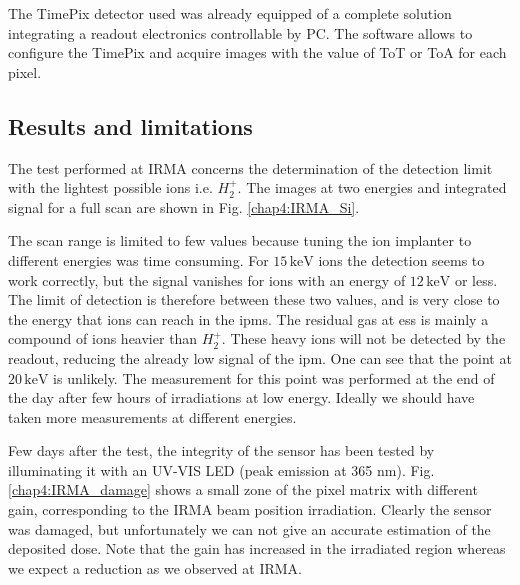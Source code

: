 \begin{refsection}
 The TimePix detector used was already equipped of a complete solution \cite{Kraus2011,advacam2019} integrating a readout electronics controllable by PC. The software allows to configure the TimePix and acquire images with the value of ToT or ToA for each pixel.

  \subsection{Results and limitations}

  The test performed at IRMA concerns the determination of the detection limit with the lightest possible ions i.e. $H_{2}^{+}$. The images at two energies and integrated signal for a full scan are shown in Fig. \ref{chap4:IRMA_Si}.
  
  

  
  The scan range is limited to few values because tuning the ion implanter to different energies was time consuming. For $15\,\mathrm{keV}$ ions the detection seems to work correctly, but the signal vanishes for ions with an energy of $12\,\mathrm{keV}$ or less. The limit of detection is therefore between these two values, and is very close to the energy that ions can reach in the \acrshort{ipm}s. The residual gas at \acrshort{ess} is mainly a compound of ions heavier than $H_{2}^{+}$. These heavy ions will not be detected by the readout, reducing the already low signal of the \acrshort{ipm}. One can see that the point at $20\,\mathrm{keV}$ is unlikely. The measurement for this point was performed at the end of the day after few hours of irradiations at low energy. Ideally we should have taken more measurements at different energies.

  Few days after the test, the integrity of the sensor has been tested by illuminating it with an UV-VIS LED (peak emission at 365 nm). 
Fig. \ref{chap4:IRMA_damage} shows a small zone of the pixel matrix with different gain, corresponding to the IRMA beam position irradiation.
Clearly the sensor was damaged, but unfortunately we can not give an accurate estimation of the deposited dose. Note that the gain has increased in the irradiated region whereas we expect a reduction as we observed at IRMA.


\end{refsection}
